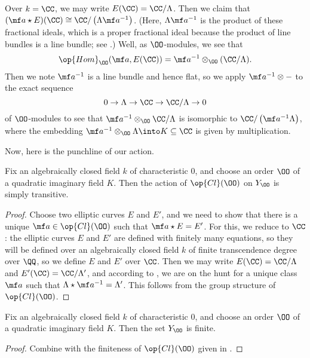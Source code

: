 \documentclass[../notes.tex]{subfiles}
\begin{document}
\begin{example} \label{ex:cl-action-on-cm-over-c}
	Over $k=\CC$, we may write $E(\CC)=\CC/\Lambda$. Then we claim that $(\mf a\star E)(\CC)\cong \CC/\left(\Lambda\mf a^{-1}\right)$. (Here, $\Lambda\mf a^{-1}$ is the product of these fractional ideals, which is a proper fractional ideal because the product of line bundles is a line bundle; see .) Well, as $\OO$-modules, we see that
	\[\op{Hom}_\OO(\mf a,E(\CC))=\mf a^{-1}\otimes_\OO(\CC/\Lambda).\]
	Then we note $\mf a^{-1}$ is a line bundle and hence flat, so we apply $\mf a^{-1}\otimes-$ to the exact sequence
	\[0\to\Lambda\to\CC\to\CC/\Lambda\to0\]
	of $\OO$-modules to see that $\mf a^{-1}\otimes_\OO\CC/\Lambda$ is isomorphic to $\CC/\left(\mf a^{-1}\Lambda\right)$, where the embedding $\mf a^{-1}\otimes_\OO\Lambda\into K\subseteq\CC$ is given by multiplication.
\end{example}
Now, here is the punchline of our action.
\begin{proposition} \label{prop:simply-transitive-cl-action}
	Fix an algebraically closed field $k$ of characteristic $0$, and choose an order $\OO$ of a quad\-ratic imaginary field $K$. Then the action of $\op{Cl}(\OO)$ on $Y_\OO$ is simply transitive.
\end{proposition}
\begin{proof}
	Choose two elliptic curves $E$ and $E'$, and we need to show that there is a unique $\mf a\in\op{Cl}(\OO)$ such that $\mf a\star E=E'$. For this, we reduce to $\CC$: the elliptic curves $E$ and $E'$ are defined with finitely many equations, so they will be defined over an algebraically closed field $k$ of finite transcendence degree over $\QQ$, so we define $E$ and $E'$ over $\CC$. Then we may write $E(\CC)=\CC/\Lambda$ and $E'(\CC)=\CC/\Lambda'$, and according to , we are on the hunt for a unique class $\mf a$ such that $\Lambda\star\mf a^{-1}=\Lambda'$. This follows from the group structure of $\op{Cl}(\OO)$.
\end{proof}
\begin{corollary} \label{cor:finitely-many-cm}
	Fix an algebraically closed field $k$ of characteristic $0$, and choose an order $\OO$ of a quad\-ratic imaginary field $K$. Then the set $Y_\OO$ is finite. 
\end{corollary}
\begin{proof}
	Combine  with the finiteness of $\op{Cl}(\OO)$ given in .
\end{proof}
\end{document}
